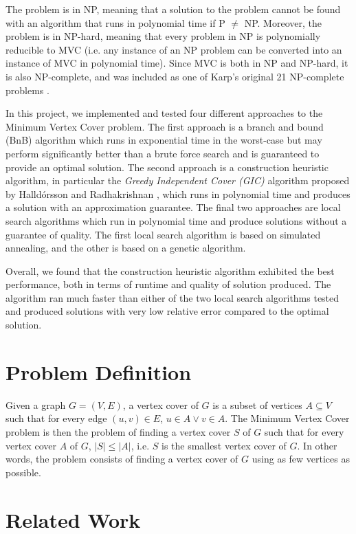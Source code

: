 \documentclass[acmlarge]{acmart}
\begin{document}
The problem is in NP, meaning that a solution to the problem cannot be found with an algorithm that runs in polynomial time if P $\neq$ NP. Moreover, the problem is in NP-hard, meaning that every problem in NP is polynomially reducible to MVC (i.e. any instance of an NP problem can be converted into an instance of MVC in polynomial time). Since MVC is both in NP and NP-hard, it is also NP-complete, and was included as one of Karp's original 21 NP-complete problems \cite{karp1972reducibility}.

In this project, we implemented and tested four different approaches to the Minimum Vertex Cover problem. The first approach is a branch and bound (BnB) algorithm which runs in exponential time in the worst-case but may perform significantly better than a brute force search and is guaranteed to provide an optimal solution. The second approach is a construction heuristic algorithm, in particular the \textit{Greedy Independent Cover (GIC)} algorithm proposed by Halld\'{o}rsson and Radhakrishnan \cite{Hall97}, which runs in polynomial time and produces a solution with an approximation guarantee. The final two approaches are local search algorithms which run in polynomial time and produce solutions without a guarantee of quality. The first local search algorithm is based on simulated annealing, and the other is based on a genetic algorithm.

Overall, we found that the construction heuristic algorithm exhibited the best performance, both in terms of runtime and quality of solution produced. The algorithm ran much faster than either of the two local search algorithms tested and produced solutions with very low relative error compared to the optimal solution. 


\section{Problem Definition}

Given a graph $G = (V,E)$, a vertex cover of $G$ is a subset of vertices $A \subseteq V$ such that for every edge $(u,v) \in E$, $u \in A \lor v \in A$. The Minimum Vertex Cover problem is then the problem of finding a vertex cover $S$ of $G$ such that for every vertex cover $A$ of $G$, $|S| \leq |A|$, i.e. $S$ is the smallest vertex cover of $G$. In other words, the problem consists of finding a vertex cover of $G$ using as few vertices as possible.

\section{Related Work}
\end{document}
